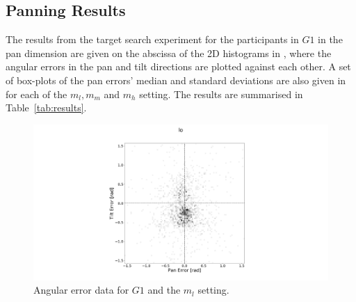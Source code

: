 \documentclass[sigconf, screen=true, anonymous=true]{acmart}
\begin{document}




\subsection{Panning Results}

The results from the target search experiment for the participants in $G1$ in the pan dimension are given on the abscissa of the 2D histograms in , where the angular errors in the pan and tilt directions are plotted against each other.
A set of box-plots of the pan errors' median and standard deviations are also given in  for each of the $m_l, m_m$ and $m_h$ setting. 
The results are summarised in Table~\ref{tab:results}.

\begin{figure}
  \centering
  \includegraphics[clip, trim=450 0 450 110, width=0.8\columnwidth]{figures/err_lo.png}
  \caption{Angular error data for $G1$ and the $m_l$ setting. }\label{fig:err-results-lo}
\end{figure}
\end{document}
